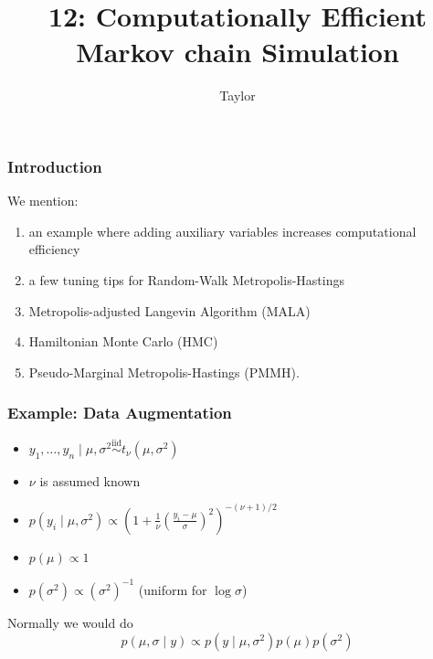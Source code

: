 \documentclass{beamer}
\title["12"]{12: Computationally Efficient Markov chain Simulation}
\author{Taylor}
\institute[UVA] 
{
University of Virginia \\
\medskip
\textit{} 
}
\date{}
\begin{document}

\begin{frame}
\titlepage 
\end{frame}

\begin{frame}
\frametitle{Introduction}

We mention:
\begin{enumerate}
\item an example where adding auxiliary variables increases computational efficiency
\item a few tuning tips for Random-Walk Metropolis-Hastings
\item Metropolis-adjusted Langevin Algorithm (MALA)
\item Hamiltonian Monte Carlo (HMC)
\item Pseudo-Marginal Metropolis-Hastings (PMMH).
\end{enumerate}


\end{frame}


\begin{frame}
\frametitle{Example: Data Augmentation}

\begin{itemize}
\item $y_1, \ldots, y_n \mid \mu, \sigma^2 \overset{\text{iid}}{\sim} t_{\nu}(\mu, \sigma^2)$
\item $\nu$ is assumed known
\item $p(y_i \mid \mu, \sigma^2) \propto \left(1 + \frac{1}{\nu}\left(\frac{y_i - \mu}{\sigma} \right)^2 \right)^{-(\nu+1)/2}$
\item $p(\mu) \propto 1$
\item $p(\sigma^2) \propto (\sigma^2)^{-1}$ (uniform for $\log \sigma$)
\end{itemize}
\pause

Normally we would do
$$
p(\mu, \sigma \mid y) \propto p(y \mid \mu, \sigma^2)p(\mu)p(\sigma^2)
$$
\newline

\end{frame}
\end{document}
